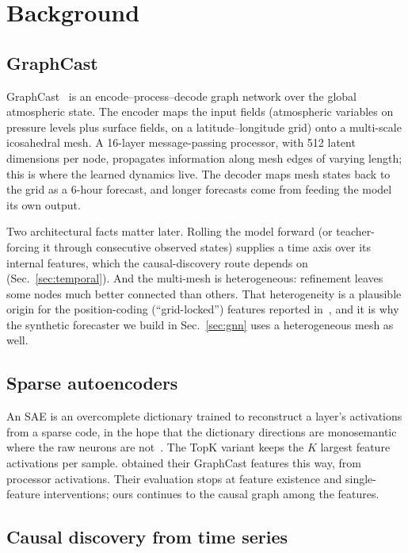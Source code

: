 \section{Background}
\label{sec:background}

\subsection{GraphCast}

GraphCast~\cite{graphcast} is an encode--process--decode graph network over the
global atmospheric state. The encoder maps the input fields (atmospheric variables
on pressure levels plus surface fields, on a latitude--longitude grid) onto a
multi-scale icosahedral mesh. A 16-layer message-passing processor, with 512 latent
dimensions per node, propagates information along mesh edges of varying length;
this is where the learned dynamics live. The decoder maps mesh states back to the
grid as a 6-hour forecast, and longer forecasts come from feeding the model its own
output.

Two architectural facts matter later. Rolling the model forward (or teacher-forcing
it through consecutive observed states) supplies a time axis over its internal
features, which the causal-discovery route depends on (Sec.~\ref{sec:temporal}).
And the multi-mesh is heterogeneous: refinement leaves some nodes much better
connected than others. That heterogeneity is a plausible origin for the
position-coding (``grid-locked'') features reported in~\cite{macmillan2025}, and it
is why the synthetic forecaster we build in Sec.~\ref{sec:gnn} uses a heterogeneous
mesh as well.

\subsection{Sparse autoencoders}

An SAE is an overcomplete dictionary trained to reconstruct a layer's activations
from a sparse code, in the hope that the dictionary directions are monosemantic
where the raw neurons are not~\cite{cunningham2023,bricken2023}. The TopK variant
keeps the $K$ largest feature activations per sample. \citet{macmillan2025}
obtained their GraphCast features this way, from processor activations. Their
evaluation stops at feature existence and single-feature interventions; ours
continues to the causal graph among the features.

\subsection{Causal discovery from time series}

